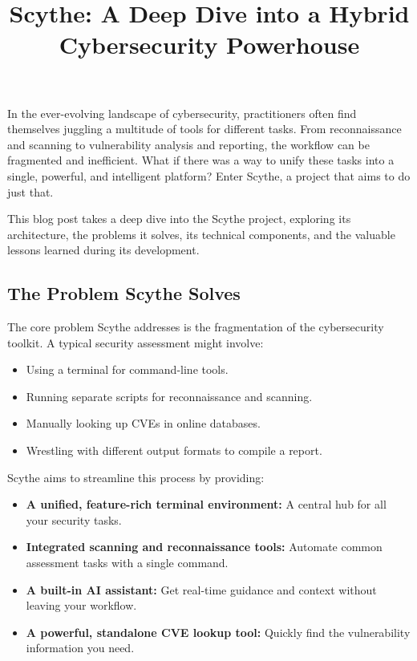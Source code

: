 \documentclass{article}
\title{Scythe: A Deep Dive into a Hybrid Cybersecurity Powerhouse}
\author{}
\date{}
\begin{document}
\maketitle

In the ever-evolving landscape of cybersecurity, practitioners often
find themselves juggling a multitude of tools for different tasks. From
reconnaissance and scanning to vulnerability analysis and reporting, the
workflow can be fragmented and inefficient. What if there was a way to
unify these tasks into a single, powerful, and intelligent platform?
Enter Scythe, a project that aims to do just that.

This blog post takes a deep dive into the Scythe project, exploring its
architecture, the problems it solves, its technical components, and the
valuable lessons learned during its development.

\subsection{The Problem Scythe Solves}\label{the-problem-scythe-solves}

The core problem Scythe addresses is the fragmentation of the
cybersecurity toolkit. A typical security assessment might involve:

\begin{itemize}
\item
  Using a terminal for command-line tools.
\item
  Running separate scripts for reconnaissance and scanning.
\item
  Manually looking up CVEs in online databases.
\item
  Wrestling with different output formats to compile a report.
\end{itemize}

Scythe aims to streamline this process by providing:

\begin{itemize}
\item
  \textbf{A unified, feature-rich terminal environment:} A central hub
  for all your security tasks.
\item
  \textbf{Integrated scanning and reconnaissance tools:} Automate common
  assessment tasks with a single command.
\item
  \textbf{A built-in AI assistant:} Get real-time guidance and context
  without leaving your workflow.
\item
  \textbf{A powerful, standalone CVE lookup tool:} Quickly find the
  vulnerability information you need.
\end{itemize}
\end{document}

